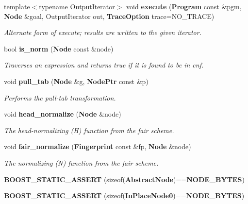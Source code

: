 \begin{CompactItemize}
\item 
template$<$typename Output\-Iterator$>$ void {\bf execute} ({\bf Program} const \&pgm, {\bf Node} \&goal, Output\-Iterator out, {\bf Trace\-Option} trace=NO\_\-TRACE)\label{namespacesprite_a52}

\begin{CompactList}\small\item\em Alternate form of execute; results are written to the given iterator. \item\end{CompactList}\item 
bool {\bf is\_\-norm} ({\bf Node} const \&node)\label{namespacesprite_a53}

\begin{CompactList}\small\item\em Traverses an expression and returns true if it is found to be in cnf. \item\end{CompactList}\item 
void {\bf pull\_\-tab} ({\bf Node} \&g, {\bf Node\-Ptr} const \&p)
\begin{CompactList}\small\item\em Performs the pull-tab transformation. \item\end{CompactList}\item 
void {\bf head\_\-normalize} ({\bf Node} \&node)
\begin{CompactList}\small\item\em The head-normalizing (H) function from the fair scheme. \item\end{CompactList}\item 
void {\bf fair\_\-normalize} ({\bf Fingerprint} const \&fp, {\bf Node} \&node)\label{namespacesprite_a56}

\begin{CompactList}\small\item\em The normalizing (N) function from the fair scheme. \item\end{CompactList}\item 
{\bf BOOST\_\-STATIC\_\-ASSERT} (sizeof({\bf Abstract\-Node})=={\bf NODE\_\-BYTES})\label{namespacesprite_a57}

\item 
{\bf BOOST\_\-STATIC\_\-ASSERT} (sizeof({\bf In\-Place\-Node0})=={\bf NODE\_\-BYTES})\label{namespacesprite_a58}


\end{CompactItemize}
